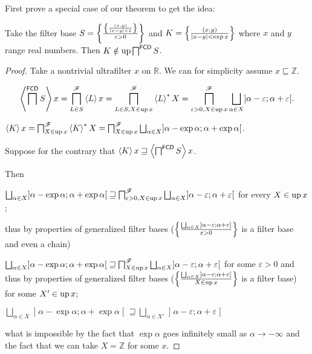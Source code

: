 First prove a special case of our theorem to get the idea:

\begin{example}
  Take the filter base $S = \left\{ \frac{
  \left\{ \frac{ (x, y) }{ | x - y | < \varepsilon }\right\}}{ \varepsilon > 0 }\right\}$ and $K = \left\{ \frac{ (x, y) }{
  | x - y | < \exp x }\right\}$ where $x$ and $y$ range real
  numbers. Then $K \notin \operatorname{up} \bigsqcap^{\mathsf{FCD}} S$.
\end{example}

\begin{proof}
  Take a nontrivial ultrafilter $x$ on $\mathbb{R}$. We can for simplicity
  assume $x \sqsubseteq \mathbb{Z}$.
  
  \[ \supfun{\bigsqcap^{\mathsf{FCD}} S} x =
  \bigsqcap^{\mathscr{F}}_{L \in S} \supfun{L} x =
  \bigsqcap^{\mathscr{F}}_{L \in S, X \in \up x} \rsupfun{L} X =
  \bigsqcap^{\mathscr{F}}_{\varepsilon > 0, X \in \up
  x} \bigsqcup_{\alpha \in X} \mathopen] \alpha - \varepsilon ; \alpha + \varepsilon \mathclose[. \]
  
  $\supfun{K} x = \bigsqcap^{\mathscr{F}}_{X \in \up x} \rsupfun{K} X =
  \bigsqcap^{\mathscr{F}}_{X \in \up x}
  \bigsqcup_{\alpha \in X}\mathopen] \alpha - \exp \alpha ; \alpha + \exp \alpha \mathclose[$.
  
  Suppose for the contrary that $\left\langle K\right\rangle x \sqsupseteq \left\langle 
  \bigsqcap^{\mathsf{FCD}} S \right\rangle x$.
  
  Then
  
  $\bigsqcup_{\alpha \in X} \mathopen] \alpha - \exp \alpha ; \alpha + \exp \alpha \mathclose[
  \sqsupseteq \bigsqcap^{\mathscr{F}}_{\varepsilon > 0, X \in \up x}
  \bigsqcup_{\alpha \in X} \mathopen] \alpha - \varepsilon ; \alpha + \varepsilon \mathclose[$ for
  every $X \in \operatorname{up} x$;
  
  thus by properties of generalized filter bases ($\setcond{ \bigsqcup_{\alpha
  \in X} \mathopen] \alpha - \varepsilon ; \alpha + \varepsilon \mathclose[ }{
  \varepsilon > 0 }$ is a filter base and even a chain)
  
  $\bigsqcup_{\alpha \in X} \mathopen] \alpha - \exp \alpha ; \alpha + \exp \alpha \mathclose[
  \sqsupseteq \bigsqcap^{\mathscr{F}}_{X \in \up x} \bigsqcup_{\alpha
  \in X} \mathopen] \alpha - \varepsilon ; \alpha + \varepsilon \mathclose[$ for some $\varepsilon
  > 0$ and thus
  by properties of generalized filter bases ($\setcond{ \bigsqcup_{\alpha \in
  X} \mathopen] \alpha - \varepsilon ; \alpha + \varepsilon \mathclose[ }{
  X \in \up x }$ is a filter base) for some $X' \in \operatorname{up} x$;
  
  $\bigsqcup_{\alpha \in X} \mathopen] \alpha - \exp \alpha ; \alpha + \exp \alpha \mathclose[
  \sqsupseteq \bigsqcup_{\alpha \in X'} \mathopen] \alpha - \varepsilon ; \alpha +
  \varepsilon \mathclose[$
  
  what is impossible by the fact that $\exp \alpha$ goes infinitely small as
  $\alpha \rightarrow - \infty$ and the fact that we can take $X =\mathbb{Z}$
  for some $x$.
\end{proof}

